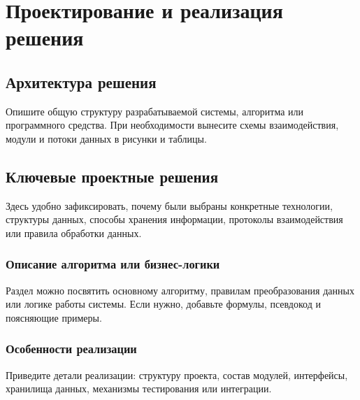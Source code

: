 \chapter{Проектирование и реализация решения}\label{ch:implementation}

\section{Архитектура решения}\label{sec:implementation-architecture}

Опишите общую структуру разрабатываемой системы, алгоритма или программного
средства. При необходимости вынесите схемы взаимодействия, модули и потоки
данных в рисунки и таблицы.

\section{Ключевые проектные решения}\label{sec:implementation-decisions}

Здесь удобно зафиксировать, почему были выбраны конкретные технологии,
структуры данных, способы хранения информации, протоколы взаимодействия или
правила обработки данных.

\subsection{Описание алгоритма или бизнес-логики}\label{subsec:implementation-logic}

Раздел можно посвятить основному алгоритму, правилам преобразования данных или
логике работы системы. Если нужно, добавьте формулы, псевдокод и поясняющие
примеры.

\subsection{Особенности реализации}\label{subsec:implementation-details}

Приведите детали реализации: структуру проекта, состав модулей, интерфейсы,
хранилища данных, механизмы тестирования или интеграции.
